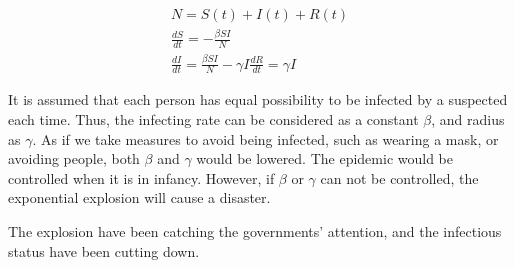 \documentclass[]{article}
\begin{document}
\begin{center}
\begin{gather}
N = S(t) + I(t) + R(t)\\
\frac{dS}{dt} = -\frac{\beta SI}{N}\\
\frac{dI}{dt} = \frac{\beta SI}{N} - \gamma I
\frac{dR}{dt} = \gamma I
\end{gather}
\end{center}
\par
It is assumed that each person has equal possibility to be infected by a suspected each time. Thus, the infecting rate can be considered as a constant $\beta$, and radius as $\gamma$. As if we take measures to avoid being infected, such as wearing a mask, or avoiding people, both $\beta$ and $\gamma$ would be lowered. The epidemic would be controlled when it is in infancy. However, if $\beta$ or $\gamma$ can not be controlled, the exponential explosion will cause a disaster.
\par
The explosion have been catching the governments' attention, and the infectious status have been cutting down.




\end{document}
